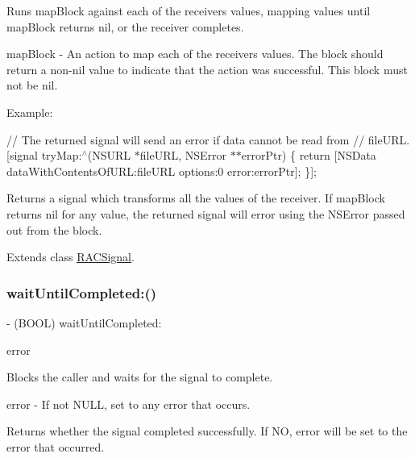 Runs {\ttfamily map\+Block} against each of the receiver\textquotesingle{}s values, mapping values until {\ttfamily map\+Block} returns nil, or the receiver completes.

map\+Block -\/ An action to map each of the receiver\textquotesingle{}s values. The block should return a non-\/nil value to indicate that the action was successful. This block must not be nil.

Example\+:

// The returned signal will send an error if data cannot be read from // {\ttfamily file\+U\+RL}. \mbox{[}signal try\+Map\+:$^\wedge$(N\+S\+U\+RL $\ast$file\+U\+RL, N\+S\+Error $\ast$$\ast$error\+Ptr) \{ return \mbox{[}N\+S\+Data data\+With\+Contents\+Of\+U\+RL\+:file\+U\+RL options\+:0 error\+:error\+Ptr\mbox{]}; \}\mbox{]};

Returns a signal which transforms all the values of the receiver. If {\ttfamily map\+Block} returns nil for any value, the returned signal will error using the {\ttfamily N\+S\+Error} passed out from the block. 

Extends class \mbox{\hyperlink{interface_r_a_c_signal_a282c8989886b5b9a75e4ecb298221b58}{R\+A\+C\+Signal}}.

\mbox{\label{category_r_a_c_signal_07_operations_08_af4c476fc335ca830841bd4fd267f05ce}} 
\subsubsection{\texorpdfstring{wait\+Until\+Completed\+:()}{waitUntilCompleted:()}\hspace{0.1cm}{\footnotesize\ttfamily [1/3]}}
{\footnotesize\ttfamily -\/ (B\+O\+OL) wait\+Until\+Completed\+: \begin{DoxyParamCaption}\item[{(N\+S\+Error $\ast$$\ast$)}]{error }\end{DoxyParamCaption}}

Blocks the caller and waits for the signal to complete.

error -\/ If not N\+U\+LL, set to any error that occurs.

Returns whether the signal completed successfully. If NO, {\ttfamily error} will be set to the error that occurred. 

